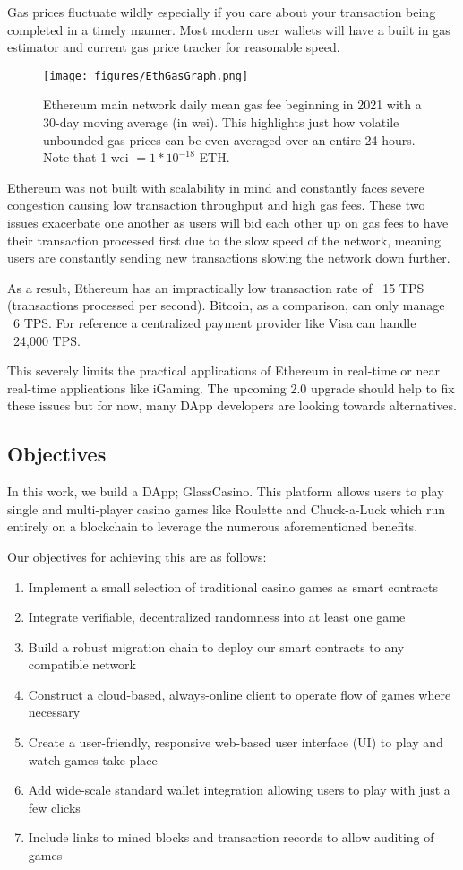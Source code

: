 \documentclass[10pt,journal,compsoc]{IEEEtran}
\begin{document}
Gas prices fluctuate wildly especially if you care about your transaction being completed in a timely manner. Most modern user wallets will have a built in gas estimator and current gas price tracker for reasonable speed. 

\begin{figure}[!h]
    \centering
    \texttt{[image: figures/EthGasGraph.png]}
    \caption{Ethereum main network daily mean gas fee beginning in 2021 with a 30-day moving average (in wei). This highlights just how volatile unbounded gas prices can be even averaged over an entire 24 hours. Note that 1 wei $ = 1*10^{-18}$ ETH.}
    \label{fig:ethgas}
\end{figure}

Ethereum was not built with scalability in mind and constantly faces severe congestion causing low transaction throughput and high gas fees. These two issues exacerbate one another as users will bid each other up on gas fees to have their transaction processed first due to the slow speed of the network, meaning users are constantly sending new transactions slowing the network down further. 

As a result, Ethereum has an impractically low transaction rate of ~15 TPS (transactions processed per second). Bitcoin, as a comparison, can only manage ~6 TPS. For reference a centralized payment provider like Visa can handle ~24,000 TPS. 

This severely limits the practical applications of Ethereum in real-time or near real-time applications like iGaming. The upcoming 2.0 upgrade should help to fix these issues but for now, many DApp developers are looking towards alternatives.
\subsection{Objectives}
\label{sec:objectives}
In this work, we build a DApp; GlassCasino. This platform allows users to play single and multi-player casino games like Roulette and Chuck-a-Luck \cite{Chuckaluck} which run entirely on a blockchain to leverage the numerous aforementioned  benefits.

Our objectives for achieving this are as follows:
\begin{enumerate}
    \item Implement a small selection of traditional casino games as smart contracts
    \item Integrate verifiable, decentralized randomness into at least one game
    \item Build a robust migration chain to deploy our smart contracts to any compatible network
    \item Construct a cloud-based, always-online client to operate flow of games where necessary
    \item Create a user-friendly, responsive web-based user interface (UI) to play and watch games take place
    \item Add wide-scale standard wallet integration allowing users to play with just a few clicks
    \item Include links to mined blocks and transaction records to allow auditing of games
\end{enumerate}
\end{document}
